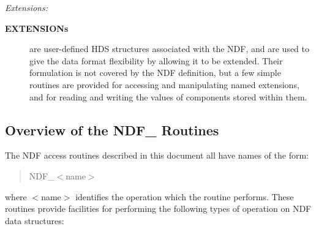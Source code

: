 \documentclass[twoside,11pt]{article}
\newcommand{\xref}[3]{#1}
\newcommand{\xlabel}[1]{}
\newcommand{\st}[1]{{\em{#1}}}
\begin{document}
\newpage
{\large \st{Extensions:}}

\begin{description}

\item[{\bf EXTENSIONs}] are user-defined \xref{HDS
structures}{sun92}{HDS_objects} associated with the NDF, and are used
to give the data format flexibility by allowing it to be extended.
Their formulation is not covered by the NDF definition, but a few simple
routines are provided for accessing and manipulating named extensions, and
for reading and writing the values of components stored within them. 

\end{description}

\subsection{\xlabel{overview_of_the_ndf_routines}Overview of the NDF\_ Routines}

The NDF access routines described in this document all have names of the 
form:

\small
\begin{quote}
NDF\_$<$name$>$
\end{quote}
\normalsize

where $<$name$>$ identifies the operation which the routine performs.
These routines provide facilities for performing the following types of
operation on NDF data structures: 
\end{document}
